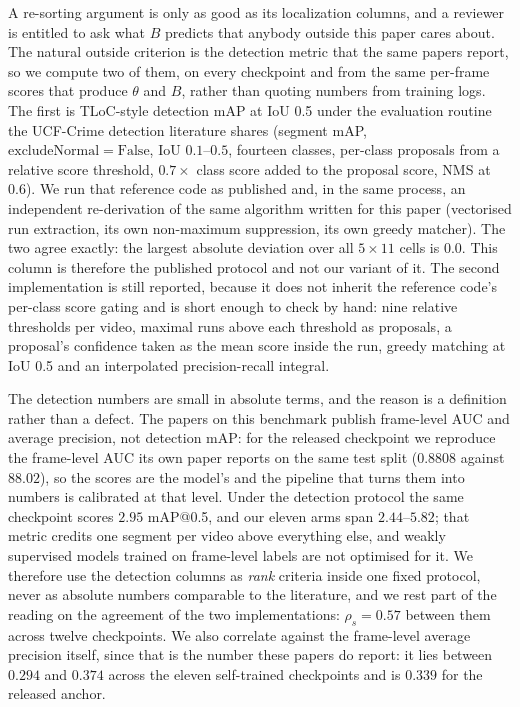 \documentclass[number,preprint,12pt]{elsarticle}
\begin{document}
A re-sorting argument is only as good as its localization columns, and a reviewer is
entitled to ask what \(B\) predicts that anybody outside this paper cares about.
The natural outside criterion is the detection metric that the same papers
report, so we compute two of them, on every checkpoint and from the same
per-frame scores that produce \(\theta\) and \(B\), rather than quoting numbers from
training logs. The first is TLoC-style detection mAP at IoU 0.5 under the
evaluation routine the UCF-Crime detection literature shares (segment mAP,
\(\mathrm{excludeNormal}=\mathrm{False}\), IoU \(0.1\)--\(0.5\), fourteen classes,
per-class proposals from a relative score threshold, \(0.7\times\) class score
added to the proposal score, NMS at 0.6). We run that reference code as
published and, in the same process, an independent re-derivation of the same
algorithm written for this paper (vectorised run extraction, its own
non-maximum suppression, its own greedy matcher). The two agree exactly: the
largest absolute deviation over all \(5\times11\) cells is \(0.0\). This column is
therefore the published protocol and not our variant of it. The second
implementation is still reported, because it does not inherit the reference
code's per-class score gating and is short enough to check by hand: nine
relative thresholds per video, maximal runs above each threshold as proposals, a
proposal's confidence taken as the mean score inside the run, greedy matching at
IoU 0.5 and an interpolated precision-recall integral.

The detection numbers are small in absolute terms, and the reason is a
definition rather than a defect. The papers on this benchmark publish
frame-level AUC and average precision, not detection mAP: for the released
checkpoint we reproduce the frame-level AUC its own paper reports on the same
test split (\(0.8808\) against \(88.02\)), so the scores are the model's and the
pipeline that turns them into numbers is calibrated at that level. Under the
detection protocol the same checkpoint scores \(2.95\) mAP@0.5, and our eleven
arms span \(2.44\)--\(5.82\); that metric credits one segment per video above
everything else, and weakly supervised models trained on frame-level labels are
not optimised for it. We therefore use the detection columns as \emph{rank} criteria
inside one fixed protocol, never as absolute numbers comparable to the
literature, and we rest part of the reading on the agreement of the two
implementations: \(\rho_s=0.57\) between them across twelve checkpoints. We also
correlate against the frame-level average precision itself, since that is the
number these papers do report: it lies between \(0.294\) and \(0.374\) across the
eleven self-trained checkpoints and is \(0.339\) for the released anchor.
\end{document}
